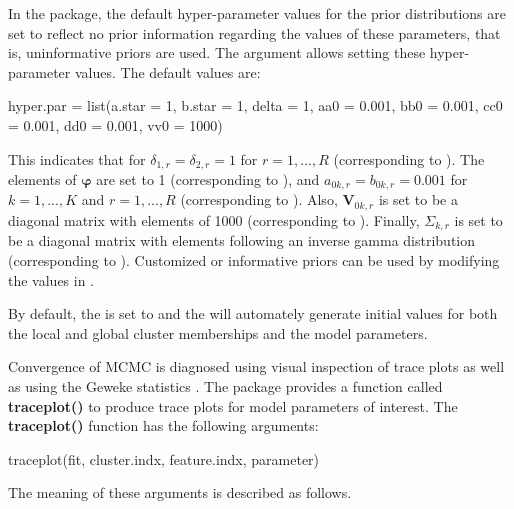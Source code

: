 In the  package, the default hyper-parameter values for the prior distributions are set to reflect no prior information regarding the values of these parameters, that is, uninformative priors are used. The argument  allows setting these hyper-parameter values. The default values are: 
\begin{example}
hyper.par = list(a.star = 1, b.star = 1, delta = 1, 
		       aa0 = 0.001, bb0 = 0.001, cc0 = 0.001, dd0 = 0.001,  
			  vv0 = 1000)
\end{example}
This indicates that for $\delta_{1,r} = \delta_{2,r} = 1$ for $r = 1,...,R$ (corresponding to ). The elements of $\boldsymbol{\varphi}$ are set to 1 (corresponding to ), and $a_{0k,r} = b_{0k,r} = 0.001 $ for $k = 1,...,K$ and $r = 1,...,R$ (corresponding to ).  Also, $\boldsymbol{V}_{0k,r}$ is set to be a diagonal matrix with elements of 1000 (corresponding to ). Finally, $\Sigma_{k,r}$ is set to be a diagonal matrix with elements following an inverse gamma distribution (corresponding to ). Customized or informative priors can be used by modifying the values in .


By default, the  is set to  and the  will automately generate initial values for both the local and global cluster memberships and the model parameters. 

Convergence of MCMC is diagnosed using visual inspection of trace plots as well as using the Geweke statistics \citep{Geweke1991}.  The  package provides a function called \textbf{traceplot()} to produce trace plots for model parameters of interest. The \textbf{traceplot()} function has the following arguments: 
\begin{example}
traceplot(fit, cluster.indx, feature.indx, parameter)
\end{example}
The meaning of these arguments is described as follows. 

